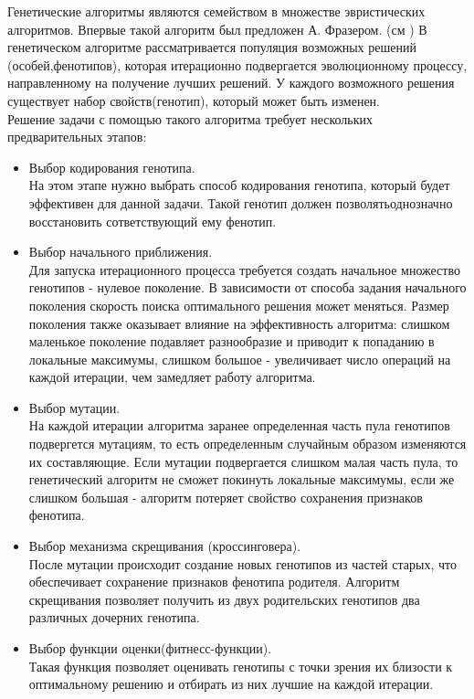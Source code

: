 Генетические алгоритмы являются семейством в множестве эвристических алгоритмов. Впервые такой алгоритм был предложен А. Фразером. (см \cite{Фразер1970})
В генетическом алгоритме рассматривается популяция возможных решений (особей,фенотипов), которая итерационно подвергается эволюционному процессу, направленному на получение лучших решений. У каждого возможного решения существует набор свойств(генотип), который может быть изменен.\\
Решение задачи с помощью такого алгоритма требует нескольких предварительных этапов:
\begin{itemize}
	\item Выбор кодирования генотипа.\\
На этом этапе нужно выбрать способ кодирования генотипа, который будет эффективен для данной задачи. Такой генотип должен позволятьоднозначно восстановить сответствующий ему фенотип.
	\item Выбор начального приближения.\\
Для запуска итерационного процесса требуется создать начальное множество генотипов - нулевое поколение. В зависимости от способа задания начального поколения скорость поиска оптимального решения может меняться. Размер поколения также оказывает влияние на эффективность алгоритма: слишком маленькое поколение подавляет разнообразие и приводит к попаданию в локальные максимумы, слишком большое - увеличивает число операций на каждой итерации, чем замедляет работу алгоритма.
	\item Выбор мутации.\\
На каждой итерации алгоритма заранее определенная часть пула генотипов подвергется мутациям, то есть определенным случайным образом изменяются их составляющие. Если мутации подвергается слишком малая часть пула, то генетический алгоритм не сможет покинуть локальные максимумы, если же слишком большая - алгоритм потеряет свойство сохранения признаков фенотипа.
	\item Выбор механизма скрещивания (кроссинговера).\\
После мутации происходит создание новых генотипов из частей старых, что обеспечивает сохранение признаков фенотипа родителя. Алгоритм скрещивания позволяет получить из двух родительских генотипов два различных дочерних генотипа.
	\item Выбор функции оценки(фитнесс-функции).\\
Такая функция позволяет оценивать генотипы с точки зрения их близости к оптимальному решению и отбирать из них лучшие на каждой итерации. 
\end{itemize}

